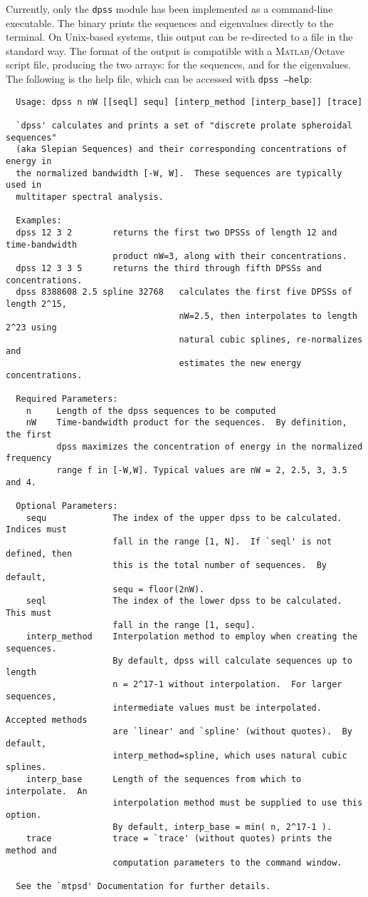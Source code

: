 Currently, only the \texttt{dpss} module has been implemented as a command-line executable.  The binary prints the sequences and eigenvalues directly to the terminal.  On Unix-based systems, this output can be re-directed to a file in the standard way.  The format of the output is compatible with a \textsc{Matlab}/Octave script file, producing the two arrays:  for the sequences, and  for the eigenvalues.  The following is the help file, which can be accessed with \texttt{dpss --help}:
{\small
\begin{verbatim}
  Usage: dpss n nW [[seql] sequ] [interp_method [interp_base]] [trace]

  `dpss' calculates and prints a set of "discrete prolate spheroidal sequences"
  (aka Slepian Sequences) and their corresponding concentrations of energy in
  the normalized bandwidth [-W, W].  These sequences are typically used in 
  multitaper spectral analysis.

  Examples:
  dpss 12 3 2        returns the first two DPSSs of length 12 and time-bandwidth
                     product nW=3, along with their concentrations.
  dpss 12 3 3 5      returns the third through fifth DPSSs and concentrations.
  dpss 8388608 2.5 spline 32768   calculates the first five DPSSs of length 2^15,
                                  nW=2.5, then interpolates to length 2^23 using 
                                  natural cubic splines, re-normalizes and
                                  estimates the new energy concentrations.

  Required Parameters:
    n     Length of the dpss sequences to be computed
    nW    Time-bandwidth product for the sequences.  By definition, the first
          dpss maximizes the concentration of energy in the normalized frequency 
          range f in [-W,W]. Typical values are nW = 2, 2.5, 3, 3.5 and 4.

  Optional Parameters:
    sequ             The index of the upper dpss to be calculated.  Indices must
                     fall in the range [1, N].  If `seql' is not defined, then
                     this is the total number of sequences.  By default,
                     sequ = floor(2nW). 
    seql             The index of the lower dpss to be calculated.  This must
                     fall in the range [1, sequ].
    interp_method    Interpolation method to employ when creating the sequences.
                     By default, dpss will calculate sequences up to length
                     n = 2^17-1 without interpolation.  For larger sequences, 
                     intermediate values must be interpolated.  Accepted methods
                     are `linear' and `spline' (without quotes).  By default,
                     interp_method=spline, which uses natural cubic splines.
    interp_base      Length of the sequences from which to interpolate.  An 
                     interpolation method must be supplied to use this option.
                     By default, interp_base = min( n, 2^17-1 ).
    trace            trace = `trace' (without quotes) prints the method and 
                     computation parameters to the command window.

  See the `mtpsd' Documentation for further details.
\end{verbatim}
}